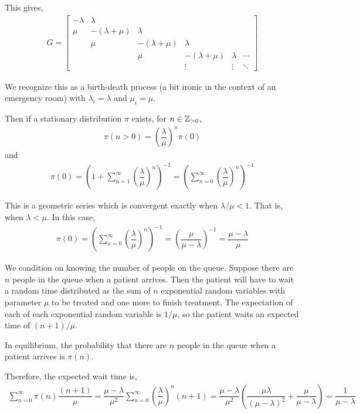 \documentclass[10pt]{article}
\begin{document}
\begin{solution}[Solution]
This gives,
\begin{align*}
    G = 
    \left[\begin{array}{cccccc}
        -\lambda & \lambda \\
        \mu & -(\lambda+\mu) & \lambda \\
        &  \mu & -(\lambda+\mu) & \lambda \\
        & &  \mu & -(\lambda+\mu) & \lambda & \cdots\\
        & & & \vdots & \vdots & \ddots 
    \end{array}\right]
\end{align*}

We recognize this as a birth-death process (a bit ironic in the context of an emergency room) with \( \lambda_i = \lambda \) and \( \mu_i=\mu \).

Then if a stationary distribution \( \pi \) exists, for \( n\in\mathbb{Z}_{>0} \),
\begin{align*}
    \pi(n>0) = \left(\dfrac{\lambda}{\mu}\right)^{n} \pi(0)
\end{align*}
and
\begin{align*}
    \pi(0) = \left( 1+\sum_{n=1}^{\infty} \left( \dfrac{\lambda}{\mu} \right)^n \right)^{-1} = \left( \sum_{n=0}^{\infty} \left( \dfrac{\lambda}{\mu} \right)^n \right)^{-1}
\end{align*}

This is a geometric series which is convergent exactly when \( \lambda/\mu < 1 \). That is, when \( \lambda < \mu \). In this case,
\begin{align*}
    \pi(0) = \left( \sum_{n=0}^{\infty} \left( \dfrac{\lambda}{\mu} \right)^n \right)^{-1} = \left(\dfrac{\mu}{\mu-\lambda}\right)^{-1} = \dfrac{\mu-\lambda}{\mu}
\end{align*}


We condition on knowing the number of people on the queue. Suppose there are \( n \) people in the queue when a patient arrives. Then the patient will have to wait a random time distributed as the sum of \( n \) exponential random variables with parameter \( \mu \) to be treated and one more to finish treatment. The expectation of each of each exponential random variable is \( 1/\mu \), so the patient waits an expected time of \( (n+1)/\mu \).

In equilibrium, the probability that there are \( n \) people in the queue when a patient arrives is \( \pi(n) \). 

Therefore, the expected wait time is,
\begin{align*}
    \sum_{n=0}^{\infty} \pi(n) \dfrac{(n+1)}{\mu} 
    = \dfrac{\mu-\lambda}{\mu^2}\sum_{n=0}^{\infty} \left( \dfrac{\lambda}{\mu} \right)^n (n+1) 
    = \dfrac{\mu-\lambda}{\mu^2} \left( \dfrac{\mu\lambda}{(\mu-\lambda)^2}+\dfrac{\mu}{\mu-\lambda} \right)
    = \dfrac{1}{\mu-\lambda}
\end{align*}
\end{solution}
\end{document}
